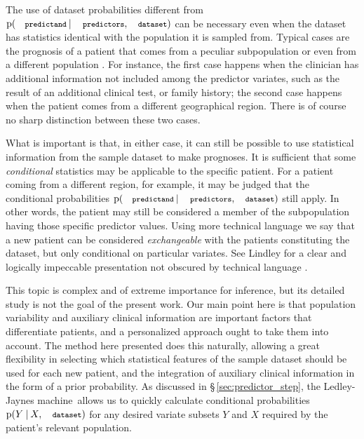 \documentclass[utf8]{FrontiersinHarvard_mod} %
\newcommand*{\sect}{\S}%
\newcommand*{\sects}{\S\S}%
\newcommand*{\chap}{ch.}%
\newcommand*{\p}{\mathrm{p}}%
\renewcommand*{\|}[1][]{\nonscript\:#1\vert\nonscript\:\mathopen{}}
\newcommand*{\predictors}{\texttt{\footnotesize predictors}}
\newcommand*{\predictand}{\texttt{\footnotesize predictand}}
\newcommand*{\dataset}{\texttt{\footnotesize dataset}}
\newcommand*{\ljm}{Ledley-Jaynes machine}
\begin{document}
\medskip

The use of dataset probabilities different from $\p(\predictand \| \predictors, \dataset)$ can be necessary even when the dataset has statistics identical with the population it is sampled from. Typical cases are the prognosis of a patient that comes from a peculiar subpopulation or even from a different population \citetext{\citealt{lindleyetal1981}; \citealt{quintanaetal2017}; \citealt[\chap~4]{soxetal1988_r2013}; \citealt[\chap~5]{huninketal2001_r2014}}. For instance, the first case happens when the clinician has additional information not included among the predictor variates, such as the result of an additional clinical test, or family history; the second case happens when the patient comes from a different geographical region. There is of course no sharp distinction between these two cases.

What is important is that, in either case, it can still be possible to use statistical information from the sample dataset to make prognoses. It is sufficient that some \emph{conditional} statistics may be applicable to the specific patient. For a patient coming from a different region, for example, it may be judged that the conditional probabilities $\p(\predictand \| \predictors, \dataset)$ still apply. In other words, the patient may still be considered a member of the subpopulation having those specific predictor values. Using more technical language we say that a new patient can be considered \emph{exchangeable} with the patients constituting the dataset, but only conditional on particular variates. See Lindley \citetext{\citeyear[especially around \sects~7.3, 8.6]{lindley2006_r2014}; \citeyear{lindleyetal1981}} for a clear and logically impeccable presentation not obscured by technical language \citetext{more technical references are \citealt[\sects~4.2--4.3, 4.6]{definetti1930,definetti1937,dawid2013,bernardoetal1994_r2000}; see also \citealt{malinasetal2004_r2016}, \citealt{sprengeretal2021} about confounding and Simpson's paradox, to which this topic is tightly related}.

This topic is complex and of extreme importance for inference, but its detailed study is not the goal of the present work. Our main point here is that population variability and auxiliary clinical information are important factors that differentiate patients, and a personalized approach ought to take them into account. The method here presented does this naturally, allowing a great flexibility in selecting which statistical features of the sample dataset should be used for each new patient, and the integration of auxiliary clinical information in the form of a prior probability. As discussed in \sect\,\ref{sec:predictor_step}, the \ljm\ allows us to quickly calculate conditional probabilities $\p(Y\|X, \dataset)$ for any desired variate subsets $Y$ and $X$ required by the patient's relevant population.
\end{document}
